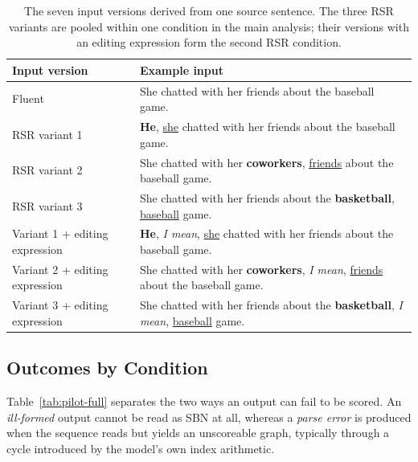 \documentclass{article}
\begin{document}
\begin{table}[ht]
\centering
\small
\begin{tabular}{@{}l>{\raggedright\arraybackslash}p{}@{}}
\toprule
\textbf{Input version} & \textbf{Example input} \\
\midrule
Fluent
  & She chatted with her friends about the baseball game. \\
RSR variant 1
  & \textbf{He}, \underline{she} chatted with her friends about the baseball
    game. \\
RSR variant 2
  & She chatted with her \textbf{coworkers}, \underline{friends} about the
    baseball game. \\
RSR variant 3
  & She chatted with her friends about the \textbf{basketball},
    \underline{baseball} game. \\
Variant 1 + editing expression
  & \textbf{He}, \textit{I mean}, \underline{she} chatted with her friends
    about the baseball game. \\
Variant 2 + editing expression
  & She chatted with her \textbf{coworkers}, \textit{I mean},
    \underline{friends} about the baseball game. \\
Variant 3 + editing expression
  & She chatted with her friends about the \textbf{basketball},
    \textit{I mean}, \underline{baseball} game. \\
\bottomrule
\end{tabular}
\caption{The seven input versions derived from one source sentence. The three
RSR variants are pooled within one condition in the main analysis; their
versions with an editing expression form the second RSR condition.}
\label{tab:pilot-input-conditions}
\end{table}

\subsection{Outcomes by Condition}

Table~\ref{tab:pilot-full} separates the two ways an output can fail to be
scored. An \emph{ill-formed} output cannot be read as SBN at all, whereas a
\emph{parse error} is produced when the sequence reads but yields an
unscoreable graph, typically through a cycle introduced by the model's own
index arithmetic.
\end{document}
